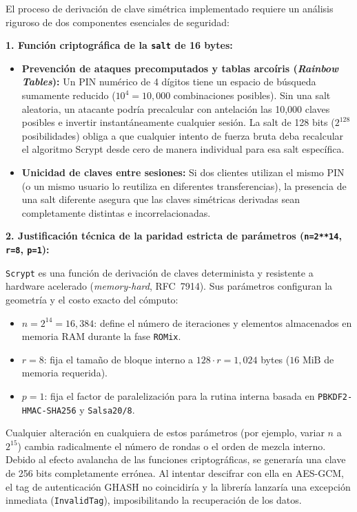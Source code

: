 \documentclass[letter,12pt]{article}
\begin{document}
El proceso de derivación de clave simétrica implementado requiere un análisis riguroso de dos componentes esenciales de seguridad:

\vspace{0.15cm}
\noindent\textbf{1. Función criptográfica de la \texttt{salt} de 16 bytes:}
\begin{itemize}
    \item \textbf{Prevención de ataques precomputados y tablas arcoíris (\textit{Rainbow Tables}):} Un PIN numérico de 4 dígitos tiene un espacio de búsqueda sumamente reducido ($10^4 = 10{,}000$ combinaciones posibles). Sin una salt aleatoria, un atacante podría precalcular con antelación las 10,000 claves posibles e invertir instantáneamente cualquier sesión. La salt de 128 bits ($2^{128}$ posibilidades) obliga a que cualquier intento de fuerza bruta deba recalcular el algoritmo Scrypt desde cero de manera individual para esa salt específica.
    \item \textbf{Unicidad de claves entre sesiones:} Si dos clientes utilizan el mismo PIN (o un mismo usuario lo reutiliza en diferentes transferencias), la presencia de una salt diferente asegura que las claves simétricas derivadas sean completamente distintas e incorrelacionadas.
\end{itemize}

\vspace{0.15cm}
\noindent\textbf{2. Justificación técnica de la paridad estricta de parámetros (\texttt{n=2**14}, \texttt{r=8}, \texttt{p=1}):}

\texttt{Scrypt} es una función de derivación de claves determinista y resistente a hardware acelerado (\textit{memory-hard}, RFC~7914). Sus parámetros configuran la geometría y el costo exacto del cómputo:
\begin{itemize}
    \item $n = 2^{14} = 16{,}384$: define el número de iteraciones y elementos almacenados en memoria RAM durante la fase \texttt{ROMix}.
    \item $r = 8$: fija el tamaño de bloque interno a $128 \cdot r = 1{,}024$ bytes ($16\text{ MiB}$ de memoria requerida).
    \item $p = 1$: fija el factor de paralelización para la rutina interna basada en \texttt{PBKDF2-HMAC-SHA256} y \texttt{Salsa20/8}.
\end{itemize}

Cualquier alteración en cualquiera de estos parámetros (por ejemplo, variar $n$ a $2^{15}$) cambia radicalmente el número de rondas o el orden de mezcla interno. Debido al efecto avalancha de las funciones criptográficas, se generaría una clave de 256 bits completamente errónea. Al intentar descifrar con ella en AES-GCM, el tag de autenticación GHASH no coincidiría y la librería lanzaría una excepción inmediata (\texttt{InvalidTag}), imposibilitando la recuperación de los datos.
\end{document}
